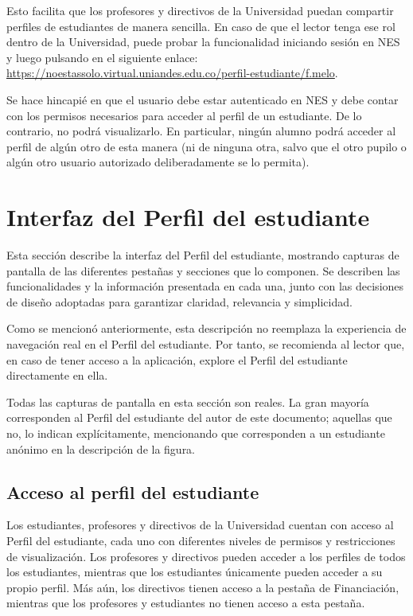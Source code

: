 Esto facilita que los profesores y directivos de la Universidad puedan compartir perfiles de estudiantes de manera sencilla. En caso de que el lector tenga ese rol dentro de la Universidad, puede probar la funcionalidad iniciando sesión en \gls{NES} y luego pulsando en el siguiente enlace: \url{https://noestassolo.virtual.uniandes.edu.co/perfil-estudiante/f.melo}.

Se hace hincapié en que el usuario debe estar autenticado en \gls{NES} y debe contar con los permisos necesarios para acceder al perfil de un estudiante. De lo contrario, no podrá visualizarlo. En particular, ningún alumno podrá acceder al perfil de algún otro de esta manera (ni de ninguna otra, salvo que el otro pupilo o algún otro usuario autorizado deliberadamente se lo permita).

\section{Interfaz del Perfil del estudiante}

Esta sección describe la interfaz del Perfil del estudiante, mostrando capturas de pantalla de las diferentes pestañas y secciones que lo componen. Se describen las funcionalidades y la información presentada en cada una, junto con las decisiones de diseño adoptadas para garantizar claridad, relevancia y simplicidad.

Como se mencionó anteriormente, esta descripción no reemplaza la experiencia de navegación real en el Perfil del estudiante. Por tanto, se recomienda al lector que, en caso de tener acceso a la aplicación, explore el Perfil del estudiante directamente en ella.

Todas las capturas de pantalla en esta sección son reales. La gran mayoría corresponden al Perfil del estudiante del autor de este documento; aquellas que no, lo indican explícitamente, mencionando que corresponden a un estudiante anónimo en la descripción de la figura.

\subsection{Acceso al perfil del estudiante}

Los estudiantes, profesores y directivos de la Universidad cuentan con acceso al Perfil del estudiante, cada uno con diferentes niveles de permisos y restricciones de visualización. Los profesores y directivos pueden acceder a los perfiles de todos los estudiantes, mientras que los estudiantes únicamente pueden acceder a su propio perfil. Más aún, los directivos tienen acceso a la pestaña de Financiación, mientras que los profesores y estudiantes no tienen acceso a esta pestaña.

